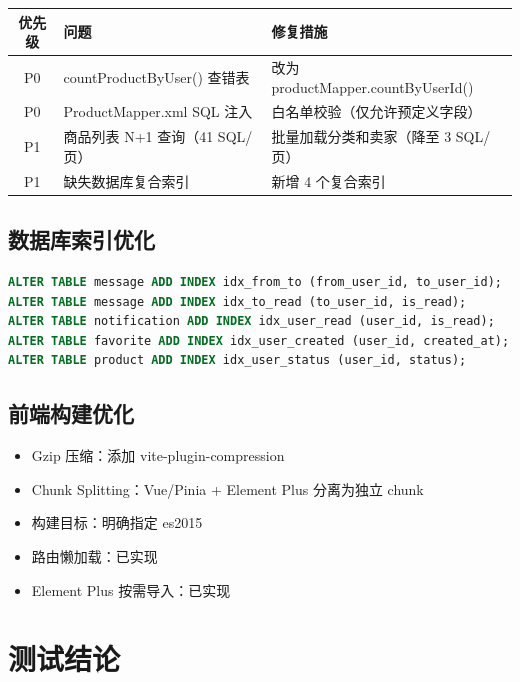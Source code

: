 \documentclass[12pt,a4paper,UTF8]{ctexart}
\begin{document}
\begin{table}[H]
\centering
\begin{tabularx}{\textwidth}{clX}
\toprule
\textbf{优先级} & \textbf{问题} & \textbf{修复措施} \\
\midrule
P0 & countProductByUser() 查错表 & 改为 productMapper.countByUserId() \\
P0 & ProductMapper.xml SQL 注入 & 白名单校验（仅允许预定义字段） \\
P1 & 商品列表 N+1 查询（41 SQL/页） & 批量加载分类和卖家（降至 3 SQL/页） \\
P1 & 缺失数据库复合索引 & 新增 4 个复合索引 \\
\bottomrule
\end{tabularx}
\end{table}

\subsection{数据库索引优化}

\begin{lstlisting}[language=SQL,label=sql:index,caption=新增索引]
ALTER TABLE message ADD INDEX idx_from_to (from_user_id, to_user_id);
ALTER TABLE message ADD INDEX idx_to_read (to_user_id, is_read);
ALTER TABLE notification ADD INDEX idx_user_read (user_id, is_read);
ALTER TABLE favorite ADD INDEX idx_user_created (user_id, created_at);
ALTER TABLE product ADD INDEX idx_user_status (user_id, status);
\end{lstlisting}

\subsection{前端构建优化}

\begin{itemize}
    \item Gzip 压缩：添加 vite-plugin-compression
    \item Chunk Splitting：Vue/Pinia + Element Plus 分离为独立 chunk
    \item 构建目标：明确指定 es2015
    \item 路由懒加载：已实现
    \item Element Plus 按需导入：已实现
\end{itemize}

\section{测试结论}
\end{document}
